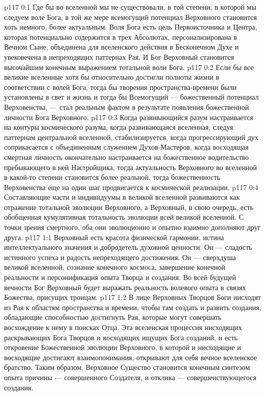 \author{Могучий Вестник}
\vs p117 0:1 Где бы во вселенной мы не существовали, в той степени, в которой мы следуем воле Бога, в той же мере всемогущий потенциал Верховного становится хоть немного, более актуальным. Воля Бога есть цель Первоисточника и Центра, которая потенциально содержится в трех Абсолютах, персонализирована в Вечном Сыне, объединена для вселенского действия в Бесконечном Духе и увековечена в непреходящих паттернах Рая. И Бог Верховный становится высочайшим конечным выражением тотальной воли Бога.
\vs p117 0:2 Если бы все великие вселенные хотя бы относительно достигли полноты жизни в соответствии с волей Бога, тогда бы творения пространства\hyp{}времени были установлены в свет и жизнь и тогда бы Всемогущий --- божественный потенциал Верховенства, --- стал реальным фактом в результате появления божественной личности Бога Верховного.
\vs p117 0:3 Когда развивающийся разум настраивается на контуры космического разума, когда развивающаяся вселенная, следуя паттернам центральной вселенной, стабилизируется, когда прогрессирующий дух соприкасается с объединенным служением Духов\hyp{}Мастеров, когда восходящая смертная личность окончательно настраивается на божественное водительство пребывающего в ней Настройщика, тогда актуальность Верховного во вселенной в какой\hyp{}то степени становится более реальной, тогда божественность Верховенства еще на один шаг продвигается к космической реализации.
\vs p117 0:4 Составляющие части и индивидуумы в великой вселенной развиваются как отражение тотальной эволюции Верховного, а Верховный, в свою очередь, есть обобщенная кумулятивная тотальность эволюции всей великой вселенной. С точки зрения смертного, оба они эволюционно и опытно взаимно дополняют друг друга.
\vs p117 1:1 Верховный есть красота физической гармонии, истина интеллектуального значения и добродетель духовной ценности. Он --- сладость истинного успеха и радость непреходящего достижения. Он --- сверхдуша великой вселенной, сознание конечного космоса, завершение конечной реальности и персонификация опыта Творца и создания. Во всей будущей вечности Бог Верховный будет выражать реальность волевого опыта в связях Божества, присущих троицам.
\vs p117 1:2 \pc В лице Верховных Творцов Боги нисходят из Рая к областям пространства и времени, чтобы там создать и развить создания, обладающие способностью достигнуть Рая, которые могут совершать восхождение к нему в поисках Отца. Эта вселенская процессия нисходящих раскрывающих Бога Творцов и восходящих ищущих Бога созданий, и есть откровение Божественной эволюции Верховного, в которой и нисходящие и восходящие достигают взаимопонимания, открывают для себя вечное вселенское братство. Таким образом, Верховное Существо становится конечным синтезом опыта причины --- совершенного Создателя, и отклика --- совершенствующегося создания.
